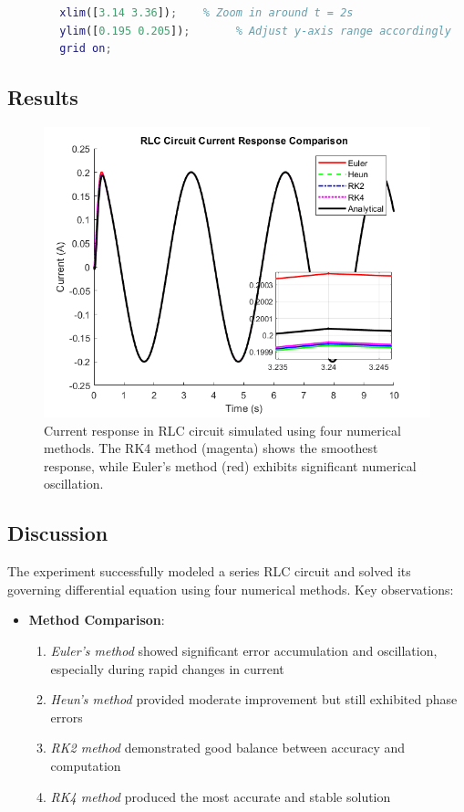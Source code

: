 \documentclass[a4paper,12pt]{article}
\begin{document}
\begin{lstlisting}[language=Matlab, caption=MATLAB Code for RLC Circuit Simulation]
		% Set zoom-in region (adjust based on where you want to zoom)
		xlim([3.14 3.36]);    % Zoom in around t = 2s
		ylim([0.195 0.205]);       % Adjust y-axis range accordingly
		grid on;
	\end{lstlisting}
	
	\subsection{Results}
	\begin{figure}[H]
		\centering
\includegraphics[width=0.81\linewidth]{Images/lab11}
		\caption{Current response in RLC circuit simulated using four numerical methods. The RK4 method (magenta) shows the smoothest response, while Euler's method (red) exhibits significant numerical oscillation.}
		\label{fig:results}
	\end{figure}
	
	\subsection{Discussion}
	The experiment successfully modeled a series RLC circuit and solved its governing differential equation using four numerical methods. Key observations:
	
	\begin{itemize}
	
		
		\item \textbf{Method Comparison}:
		\begin{enumerate}
			\item \textit{Euler's method} showed significant error accumulation and oscillation, especially during rapid changes in current
			\item \textit{Heun's method} provided moderate improvement but still exhibited phase errors
			\item \textit{RK2 method} demonstrated good balance between accuracy and computation
			\item \textit{RK4 method} produced the most accurate and stable solution
		\end{enumerate}
		
	
	\end{itemize}
	
\end{document}
